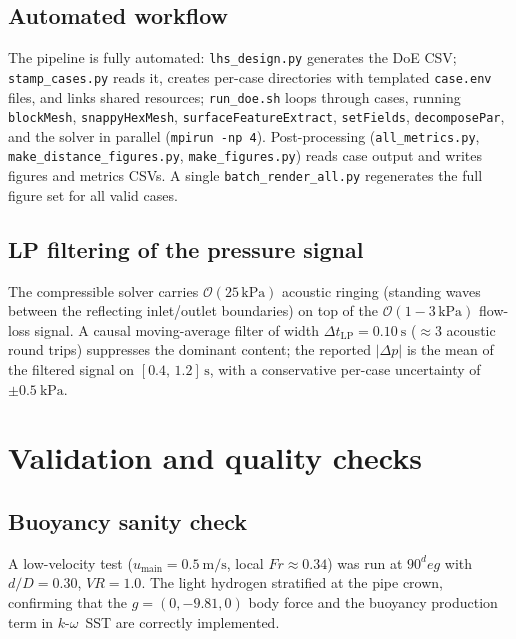 \documentclass[10pt,a4paper]{article}
\def\dD{d/D}%
\def\VR{VR}%
\def\Frnum{Fr}%
\def\circ{ deg}%
\newcommand{\dD}{\ensuremath{d/D}}
\newcommand{\VR}{\ensuremath{\mathrm{VR}}}
\newcommand{\Frnum}{\ensuremath{\mathrm{Fr}}}
\begin{document}
\subsection{Automated workflow}
\label{sec:method_workflow}
The pipeline is fully automated:
\texttt{lhs\_design.py} generates the DoE CSV;
\texttt{stamp\_cases.py} reads it, creates per-case directories
with templated \texttt{case.env} files, and links shared resources;
\texttt{run\_doe.sh} loops through cases, running
\texttt{blockMesh}, \texttt{snappyHexMesh},
\texttt{surfaceFeatureExtract}, \texttt{setFields},
\texttt{decomposePar}, and the solver in parallel
(\texttt{mpirun -np 4}).
Post-processing (\texttt{all\_metrics.py},
\texttt{make\_distance\_figures.py},
\texttt{make\_figures.py}) reads case output and writes
figures and metrics CSVs.
A single \texttt{batch\_render\_all.py} regenerates the
full figure set for all valid cases.

\subsection{LP filtering of the pressure signal}
\label{sec:dp_filter}
The compressible solver carries
\(\mathcal{O}(25\,\si{\kilo\pascal})\) acoustic ringing (standing
waves between the reflecting inlet/outlet boundaries) on top of the
\(\mathcal{O}(1\!-\!3\,\si{\kilo\pascal})\) flow-loss signal.
A causal moving-average filter of width
\(\Delta t_{\mathrm{LP}}=\SI{0.10}{\second}\) (\(\approx\!3\)
acoustic round trips) suppresses the dominant content; the
reported \(|\Delta p|\) is the mean of the filtered signal on
\([0.4,\,1.2]\,\si{\second}\), with a conservative per-case
uncertainty of \(\pm\SI{0.5}{\kilo\pascal}\).

\section{Validation and quality checks}
\label{sec:val}

\subsection{Buoyancy sanity check}
A low-velocity test (\(u_{\mathrm{main}}=
\SI{0.5}{\meter\per\second}\), local \(\Frnum\approx 0.34\))
was run at \(90^\circ\) with \(\dD=0.30\), \(\VR=1.0\).
The light hydrogen stratified at the pipe crown, confirming that
the \(g=(0,-9.81,0)\) body force and the buoyancy production
term in \(k\)-\(\omega\)~SST are correctly implemented.
\end{document}
